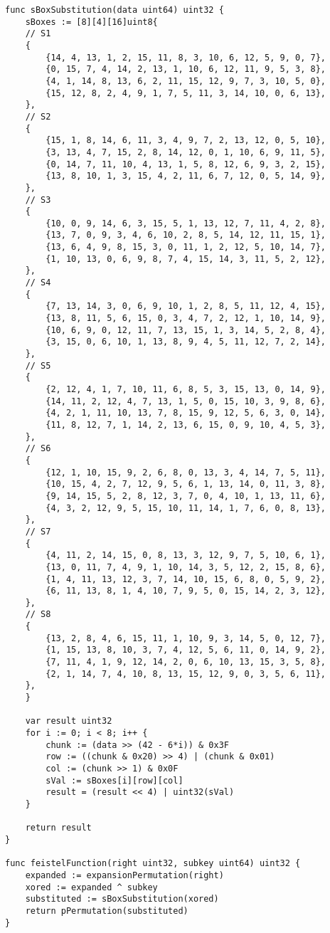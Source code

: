 \begin{lstlisting}[style=golang, caption={Реализация алгоритма шифрования и расшифровки с открытым ключом файла}, label=lst:codegolang]
func sBoxSubstitution(data uint64) uint32 {
	sBoxes := [8][4][16]uint8{
	// S1
	{
		{14, 4, 13, 1, 2, 15, 11, 8, 3, 10, 6, 12, 5, 9, 0, 7},
		{0, 15, 7, 4, 14, 2, 13, 1, 10, 6, 12, 11, 9, 5, 3, 8},
		{4, 1, 14, 8, 13, 6, 2, 11, 15, 12, 9, 7, 3, 10, 5, 0},
		{15, 12, 8, 2, 4, 9, 1, 7, 5, 11, 3, 14, 10, 0, 6, 13},
	},
	// S2
	{
		{15, 1, 8, 14, 6, 11, 3, 4, 9, 7, 2, 13, 12, 0, 5, 10},
		{3, 13, 4, 7, 15, 2, 8, 14, 12, 0, 1, 10, 6, 9, 11, 5},
		{0, 14, 7, 11, 10, 4, 13, 1, 5, 8, 12, 6, 9, 3, 2, 15},
		{13, 8, 10, 1, 3, 15, 4, 2, 11, 6, 7, 12, 0, 5, 14, 9},
	},
	// S3
	{
		{10, 0, 9, 14, 6, 3, 15, 5, 1, 13, 12, 7, 11, 4, 2, 8},
		{13, 7, 0, 9, 3, 4, 6, 10, 2, 8, 5, 14, 12, 11, 15, 1},
		{13, 6, 4, 9, 8, 15, 3, 0, 11, 1, 2, 12, 5, 10, 14, 7},
		{1, 10, 13, 0, 6, 9, 8, 7, 4, 15, 14, 3, 11, 5, 2, 12},
	},
	// S4
	{
		{7, 13, 14, 3, 0, 6, 9, 10, 1, 2, 8, 5, 11, 12, 4, 15},
		{13, 8, 11, 5, 6, 15, 0, 3, 4, 7, 2, 12, 1, 10, 14, 9},
		{10, 6, 9, 0, 12, 11, 7, 13, 15, 1, 3, 14, 5, 2, 8, 4},
		{3, 15, 0, 6, 10, 1, 13, 8, 9, 4, 5, 11, 12, 7, 2, 14},
	},
	// S5
	{
		{2, 12, 4, 1, 7, 10, 11, 6, 8, 5, 3, 15, 13, 0, 14, 9},
		{14, 11, 2, 12, 4, 7, 13, 1, 5, 0, 15, 10, 3, 9, 8, 6},
		{4, 2, 1, 11, 10, 13, 7, 8, 15, 9, 12, 5, 6, 3, 0, 14},
		{11, 8, 12, 7, 1, 14, 2, 13, 6, 15, 0, 9, 10, 4, 5, 3},
	},
	// S6
	{
		{12, 1, 10, 15, 9, 2, 6, 8, 0, 13, 3, 4, 14, 7, 5, 11},
		{10, 15, 4, 2, 7, 12, 9, 5, 6, 1, 13, 14, 0, 11, 3, 8},
		{9, 14, 15, 5, 2, 8, 12, 3, 7, 0, 4, 10, 1, 13, 11, 6},
		{4, 3, 2, 12, 9, 5, 15, 10, 11, 14, 1, 7, 6, 0, 8, 13},
	},
	// S7
	{
		{4, 11, 2, 14, 15, 0, 8, 13, 3, 12, 9, 7, 5, 10, 6, 1},
		{13, 0, 11, 7, 4, 9, 1, 10, 14, 3, 5, 12, 2, 15, 8, 6},
		{1, 4, 11, 13, 12, 3, 7, 14, 10, 15, 6, 8, 0, 5, 9, 2},
		{6, 11, 13, 8, 1, 4, 10, 7, 9, 5, 0, 15, 14, 2, 3, 12},
	},
	// S8
	{
		{13, 2, 8, 4, 6, 15, 11, 1, 10, 9, 3, 14, 5, 0, 12, 7},
		{1, 15, 13, 8, 10, 3, 7, 4, 12, 5, 6, 11, 0, 14, 9, 2},
		{7, 11, 4, 1, 9, 12, 14, 2, 0, 6, 10, 13, 15, 3, 5, 8},
		{2, 1, 14, 7, 4, 10, 8, 13, 15, 12, 9, 0, 3, 5, 6, 11},
	},
	}
	
	var result uint32
	for i := 0; i < 8; i++ {
		chunk := (data >> (42 - 6*i)) & 0x3F
		row := ((chunk & 0x20) >> 4) | (chunk & 0x01)
		col := (chunk >> 1) & 0x0F
		sVal := sBoxes[i][row][col]
		result = (result << 4) | uint32(sVal)
	}
	
	return result
}

func feistelFunction(right uint32, subkey uint64) uint32 {
	expanded := expansionPermutation(right)
	xored := expanded ^ subkey
	substituted := sBoxSubstitution(xored)
	return pPermutation(substituted)
}


\end{lstlisting}
